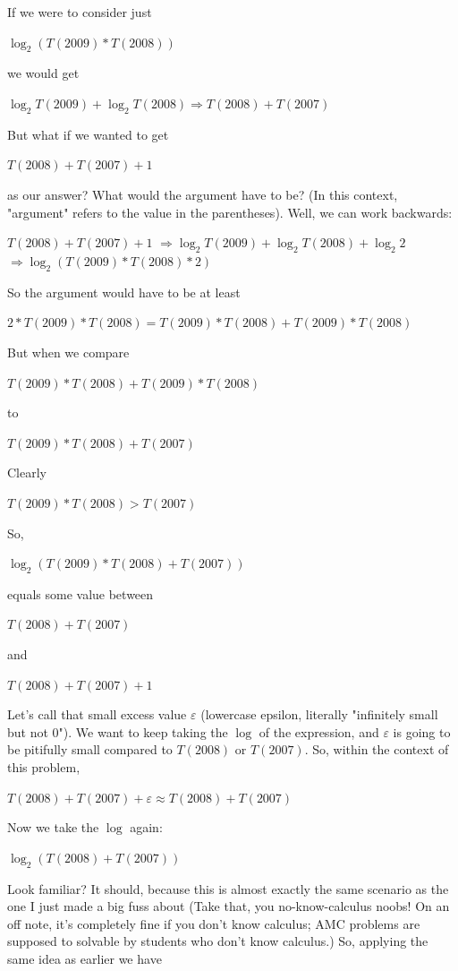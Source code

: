 \begin{enumerate}
 
If we were to consider just

 
$\log_2{(T(2009)*T(2008))}$

 
we would get

 
$\log_2{T(2009)} + \log_2{T(2008)} \Rightarrow T(2008) + T(2007)$

 
But what if we wanted to get 

 
$T(2008) + T(2007)+1$

 
as our answer? What would the argument have to be? (In this context, "argument" refers to the value in the parentheses). Well, we can work backwards:

 
$T(2008) + T(2007)+1$
$\Rightarrow \log_2{T(2009)} + \log_2{T(2008)} + \log_2{2}$
$\Rightarrow \log_2{(T(2009)*T(2008)*2)}$

 
So the argument would have to be at least

 
$2*T(2009)*T(2008) = T(2009)*T(2008)+T(2009)*T(2008)$

 
But when we compare

 
$T(2009)*T(2008)+T(2009)*T(2008)$

 to

 $T(2009)*T(2008)+T(2007)$

 
Clearly

 
$T(2009)*T(2008) > T(2007)$

 
So,

 
$\log_2{(T(2009)*T(2008)+T(2007))}$

 
equals some value between

 
$T(2008) + T(2007)$

 and

 $T(2008) + T(2007) + 1$

 
Let's call that small excess value $\varepsilon$ (lowercase epsilon, literally "infinitely small but not 0"). We want to keep taking the $\log$ of the expression, and $\varepsilon$ is going to be pitifully small compared to $T(2008)$ or $T(2007)$. So, within the context of this problem,

 
$T(2008) + T(2007) + \varepsilon \approx T(2008) + T(2007)$

 
Now we take the $\log$ again:

 
$\log_2{(T(2008)+T(2007))}$

 
Look familiar? It should, because this is almost exactly the same scenario as the one I just made a big fuss about (Take that, you no-know-calculus noobs! On an off note, it's completely fine if you don't know calculus; AMC problems are supposed to solvable by students who don't know calculus.) So, applying the same idea as earlier we have


\end{enumerate}
